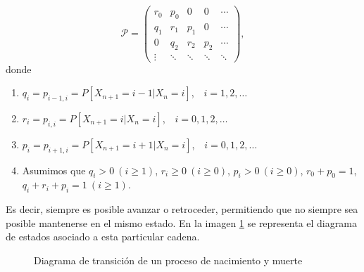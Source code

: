 \begin{equation}
    \label{eq:matriz-pnm}
    \mathcal P =\begin{pmatrix}
        r_0 & p_0 & 0 & 0 & \cdots \\
        q_1 & r_1 & p_1 & 0 & \cdots \\
        0 & q_2 & r_2 & p_2 & \cdots \\
        \vdots & \ddots & \ddots & \ddots & \ddots 
    \end{pmatrix},
\end{equation}
donde
\begin{enumerate}
    \item $q_i = p_{i-1,i} = P[X_{n+1}=i-1|X_n=i]$, $\ \ \ i=1,2,\dots$
    \item $r_i = p_{i,i} = P[X_{n+1}=i|X_n=i]$, $\ \ \ i=0,1,2,\dots$
    \item $p_i = p_{i+1,i} = P[X_{n+1}=i+1|X_n=i]$, $\ \ \ i=0,1,2,\dots$
    \item Asumimos que $q_i > 0 \ (i\geq 1)$, $r_i\geq 0 \  (i\geq 0)$, $p_i>0 \ (i\geq 0)$, $r_0+p_0 =1$, $q_i+r_i+p_i=1 \ (i\geq 1)$.
\end{enumerate}

Es decir, siempre es posible avanzar o retroceder, permitiendo que no siempre sea posible mantenerse en el mismo estado. En la imagen \ref{img:diagrama-trans-pnm} se representa el diagrama de estados asociado a esta particular cadena.

\begin{figure}[ht] 
    \label{img:diagrama-trans-pnm}
    \centering 
    \caption{Diagrama de transición de un proceso de nacimiento y muerte}
    \end{figure}

